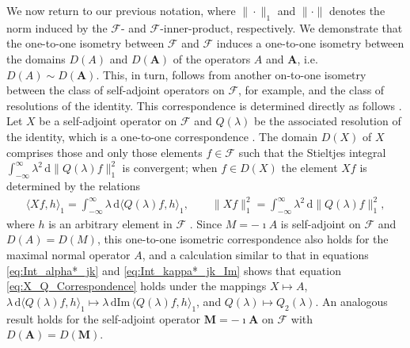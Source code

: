 \documentclass[11pt]{amsart}
\renewcommand{\d}{\mathrm{d}}
\newcommand{\Mb}{\mathbf{M}}
\newcommand{\Ab}{\mathbf{A}}
\newcommand{\Fc}{\mathcal{F}}
\newcommand{\Fs}{\mathscr{F}}
\begin{document}
We now return to our previous notation, where $\|\cdot\|_1$ and $\|\cdot\|$
denotes the norm induced by the $\Fc$- and $\Fs$-inner-product, 
respectively. We demonstrate that the one-to-one isometry between
$\Fc$ and $\Fs$ induces a one-to-one isometry between the domains
$D(A)$ and $D(\Ab)$ of the operators $A$ and $\Ab$,
i.e. $D(A)\sim D(\Ab)$. This, in turn, follows from another on-to-one
isometry between the class of self-adjoint operators on $\Fc$, for
example, and the class of resolutions of the identity. This 
correspondence is determined directly as follows \cite{Stone:64}. Let
$X$ be a self-adjoint operator on $\Fc$ and $Q(\lambda)$ be the associated
resolution of the identity, which is a one-to-one correspondence
\cite{Stone:64}. The domain $D(X)$ of $X$ comprises those and only
those elements $f\in\Fc$ such that the Stieltjes integral
$\int_{-\infty}^\infty\lambda^2\,\d\|Q(\lambda)f\|_1^2$ is convergent; when $f\in D(X)$ the element
$Xf$ is determined by the relations    
%
\begin{align}\label{eq:X_Q_Correspondence}
  \langle Xf,h\rangle_1=\int_{-\infty}^\infty\lambda\,\d\langle Q(\lambda)f,h\rangle_1, \qquad
  \|Xf\|_1^2=\int_{-\infty}^\infty\lambda^2\,\d\|Q(\lambda)f\|_1^2,
\end{align}
%
where $h$ is an arbitrary element in $\Fc$ \cite{Stone:64}. Since
$M=-\imath A$ is 
self-adjoint on $\Fc$ and $D(A)=D(M)$, this one-to-one isometric
correspondence also holds for the maximal normal operator $A$, and a
calculation similar to that in equations \eqref{eq:Int_alpha*_jk} and
\eqref{eq:Int_kappa*_jk_Im} shows that equation
\eqref{eq:X_Q_Correspondence} holds under the mappings $X\mapsto A$,
$\lambda\,\d\langle Q(\lambda)f,h\rangle_1\mapsto\lambda\,\d\text{Im}\,\langle Q(\lambda)f,h\rangle_1$, and $Q(\lambda)\mapsto Q_2(\lambda)$. An 
analogous result holds 
for the self-adjoint operator $\Mb=-\imath\Ab$ on $\Fs$ with
$D(\Ab)=D(\Mb)$.
\end{document}
